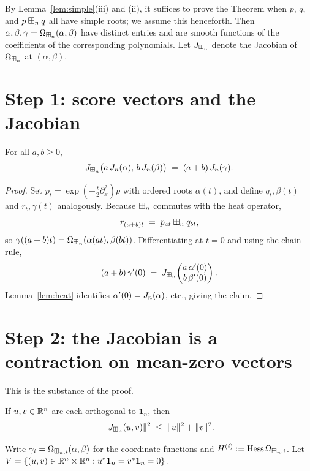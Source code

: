 \documentclass[11pt]{article}
\begin{document}
By Lemma~\ref{lem:simple}(iii) and (ii), it suffices to prove the Theorem when
$p$, $q$, and $p\boxplus_n q$ all have simple roots; we assume this henceforth. Then
$\alpha,\beta,\gamma=\Omega_{\boxplus_n}(\alpha,\beta)$ have distinct entries and are
smooth functions of the coefficients of the corresponding polynomials. Let
$J_{\boxplus_n}$ denote the Jacobian of $\Omega_{\boxplus_n}$ at $(\alpha,\beta)$.

\section*{Step 1: score vectors and the Jacobian}

\begin{qfourobservation}\label{obs:scores}
For all $a,b\ge0$,
\[
J_{\boxplus_n}\bigl(a\,J_n(\alpha),\,b\,J_n(\beta)\bigr)\;=\;(a+b)\,J_n(\gamma).
\]
\end{qfourobservation}

\begin{proof}
Set $p_t=\exp(-\tfrac t2\partial_x^2)p$ with ordered roots $\alpha(t)$, and
define $q_t,\beta(t)$ and $r_t,\gamma(t)$ analogously. Because $\boxplus_n$ commutes
with the heat operator,
\[
r_{(a+b)t}\;=\;p_{at}\boxplus_n q_{bt},
\]
so $\gamma((a+b)t)=\Omega_{\boxplus_n}(\alpha(at),\beta(bt))$. Differentiating at
$t=0$ and using the chain rule,
\[
(a+b)\,\gamma'(0)\;=\;J_{\boxplus_n}\!\begin{pmatrix} a\,\alpha'(0)\\ b\,\beta'(0)\end{pmatrix}.
\]
Lemma~\ref{lem:heat} identifies $\alpha'(0)=J_n(\alpha)$, etc., giving the
claim.
\end{proof}

\section*{Step 2: the Jacobian is a contraction on mean-zero vectors}

This is the substance of the proof.

\begin{qfourproposition}\label{prop:contraction}
If $u,v\in\mathbb{R}^n$ are each orthogonal to $\mathbf 1_n$, then
\[
\|J_{\boxplus_n}(u,v)\|^2\;\le\;\|u\|^2+\|v\|^2.
\]
\end{qfourproposition}

Write $\gamma_i=\Omega_{\boxplus_n,i}(\alpha,\beta)$ for the coordinate functions and
$H^{(i)}:=\operatorname{Hess}\Omega_{\boxplus_n,i}$. Let
$V=\{(u,v)\in\mathbb{R}^n\times\mathbb{R}^n:u^\ast\mathbf 1_n=v^\ast\mathbf 1_n=0\}$.
\end{document}
